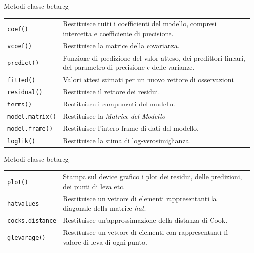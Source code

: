 \documentclass[usenames,dvipsnames]{beamer}
\begin{document}
\begin{frame}[noframenumbering]{Metodi classe betareg}

\begin{table}[t]
	\centering
	\label{MethodTable}
	\begin{tabularx}{\textwidth}{|l|X|}
		\hline
				
				\texttt{coef()}             & Restituisce tutti i coefficienti del modello, compresi intercetta e coefficiente di  precisione.                      \\
				\texttt{vcoef()}            & Restituisce la matrice della covarianza.                        \\
				\texttt{predict()}          & Funzione di predizione del valor atteso, dei predittori lineari, del parametro di precisione e delle varianze.                        \\
				\texttt{fitted()}           & Valori attesi stimati per un nuovo vettore di osservazioni.                 \\
				\texttt{residual()}         & Restituisce il vettore dei residui.                    \\
				\texttt{terms()}            & Restituisce i componenti del modello.       \\
				\texttt{model.matrix()}     & Restituisce la \emph{Matrice del Modello} \\
				\texttt{model.frame()}      & Restituisce l'intero frame di dati del modello.                       \\
				\texttt{loglik()}           & Restituisce la stima di log-verosimiglianza.                    \\ \hline
	\end{tabularx}
\end{table}
\end{frame}

\begin{frame}[noframenumbering]{Metodi classe betareg}
	\vspace{1cm}
	\begin{table}[t]
		\centering
		\label{MethodTable}
		\begin{tabularx}{\textwidth}{|l|X|}
			\hline
		\texttt{plot()}             & Stampa sul device grafico i plot dei residui, delle predizioni, dei punti di leva etc.                            \\
		\texttt{hatvalues}          & Restituisce un vettore di elementi rappresentanti la diagonale della matrice \emph{hat}.                     \\
		\texttt{cocks.distance}     & Restituisce un'approssimazione della distanza di Cook.                     \\
		\texttt{glevarage()}        & Restituisce un vettore di elementi con rappresentanti il valore di leva di ogni punto.                      \\ \hline
		\end{tabularx}
	\end{table}
\end{frame}
\end{document}

